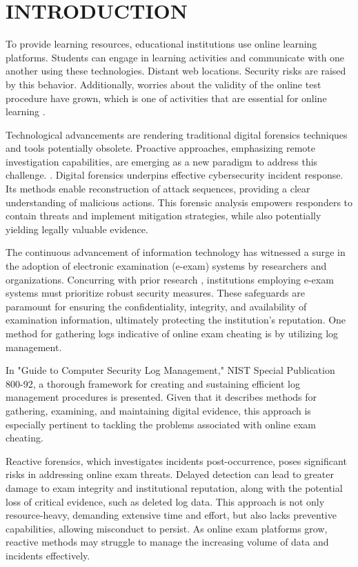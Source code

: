 \chapter{INTRODUCTION}
To provide learning resources, educational institutions use online learning platforms. Students can engage in learning activities and communicate with one another using these technologies. Distant web locations. Security risks are raised by this behavior. Additionally, worries about the validity of the online test procedure have grown, which is one of activities that are essential for online learning \cite{rosmansyah2020impersonation}.


Technological advancements are rendering traditional digital forensics techniques and tools potentially obsolete. Proactive approaches, emphasizing remote investigation capabilities, are emerging as a new paradigm to address this challenge. \citet{machaka2022InvestigatingProactiveDigitalForensicsLeveragingAdversaryEmulation}. Digital forensics underpins effective cybersecurity incident response. Its methods enable reconstruction of attack sequences, providing a clear understanding of malicious actions. This forensic analysis empowers responders to contain threats and implement mitigation strategies, while also potentially yielding legally valuable evidence\citet{johansen2017Digitalforensicsandincidentresponse}. 

The continuous advancement of information technology has witnessed a surge in the adoption of electronic examination (e-exam) systems by researchers and organizations. Concurring with prior research \citet{al2017efficienteexamscheme}, institutions employing e-exam systems must prioritize robust security measures. These safeguards are paramount for ensuring the confidentiality, integrity, and availability of examination information, ultimately protecting the institution's reputation. One method for gathering logs indicative of online exam cheating is by utilizing log management.

In "Guide to Computer Security Log Management," NIST Special Publication 800-92, a thorough framework for creating and sustaining efficient log management procedures is presented. Given that it describes methods for gathering, examining, and maintaining digital evidence, this approach is especially pertinent to tackling the problems associated with online exam cheating.

Reactive forensics, which investigates incidents post-occurrence, poses significant risks in addressing online exam threats. Delayed detection can lead to greater damage to exam integrity and institutional reputation, along with the potential loss of critical evidence, such as deleted log data. This approach is not only resource-heavy, demanding extensive time and effort, but also lacks preventive capabilities, allowing misconduct to persist. As online exam platforms grow, reactive methods may struggle to manage the increasing volume of data and incidents effectively.

